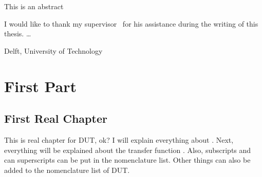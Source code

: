 \documentclass[a4paper,11pt]{mscThesis}
\begin{document}
%
\frontmatter %
%
    \maketitle
%

    This is an abstract
    \cleardoublepage
%

    I would like to thank my supervisor \mscreaderone\ for his assistance during the writing
    of this thesis. \ldots
    \vspace*{15mm}

    \noindent
    Delft, University of Technology \hfill \mscname\\
    \mscdate

%
    \tocloflot
%
    \printnomencl %
%
    \begin{acronym}[XXXXX]%
    \end{acronym}%
    \cleardoublepage%
%
    \printindex%
    \cleardoublepage%
%
%
\mainmatter
%



%
    \part{First Part}

    \chapter{First Real Chapter}

    This is real chapter for \ac{DUT}, ok? I will explain everything about . Next, everything
    will be explained about the transfer function . Also, subscripts and can
    superscripts can be put in the nomenclature  list.   Other things can also
    be added to the nomenclature list of \ac{DUT}.  
\end{document}
